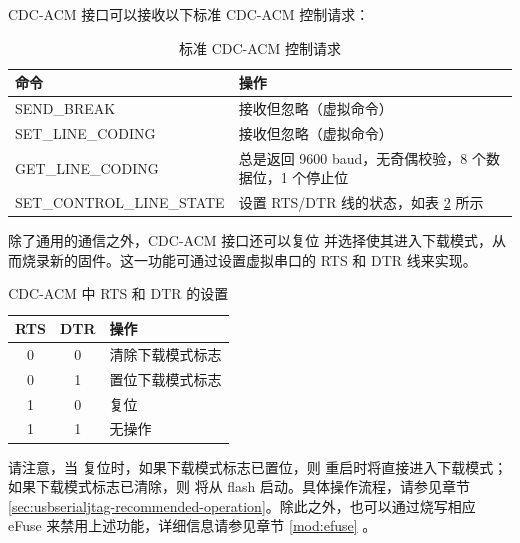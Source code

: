 \documentclass[main\_\_CN.tex]{subfiles}
\begin{document}
CDC-ACM 接口可以接收以下标准 CDC-ACM 控制请求：

\begin{table}[H]
    \centering
    \caption{标准 CDC-ACM 控制请求}
    \label{tab:usbserialjtag-standard-cdc-acm-requests}

    \begin{tabular}{ | l | l | }
    \hline
        \rowcolor{lightgray}
        \textbf{命令} & \textbf{操作} \\\hline

        SEND\_BREAK & 接收但忽略（虚拟命令）\\\hline
        SET\_LINE\_CODING & 接收但忽略（虚拟命令） \\\hline
        GET\_LINE\_CODING & 总是返回 9600 baud，无奇偶校验，8 个数据位，1 个停止位 \\\hline
        SET\_CONTROL\_LINE\_STATE & 设置 RTS/DTR 线的状态，如表 \ref{tab:usbserialjtag-cdc-acm-settings-with-rts-and-dtr} 所示 \\\hline
    \end{tabular}
\end{table}

除了通用的通信之外，CDC-ACM 接口还可以复位 \chipname{} 并选择使其进入下载模式，从而烧录新的固件。这一功能可通过设置虚拟串口的 RTS 和 DTR 线来实现。

\begin{table}[H]
    \centering
    \caption{CDC-ACM 中 RTS 和 DTR 的设置}
    \label{tab:usbserialjtag-cdc-acm-settings-with-rts-and-dtr}

    \begin{tabular}{ | c | c | p{5cm} | }
    \hline
        \rowcolor{lightgray}
        \textbf{RTS} & \textbf{DTR} & \textbf{操作}\\\hline

        0 & 0 & 清除下载模式标志 \\\hline
        0 & 1 & 置位下载模式标志  \\\hline
        1 & 0 & 复位 \chipname{}  \\\hline
        1 & 1 & 无操作 \\\hline
    \end{tabular}
\end{table}

请注意，当 \chipname{} 复位时，如果下载模式标志已置位，则 \chipname{} 重启时将直接进入下载模式；如果下载模式标志已清除，则 \chipname{} 将从 flash 启动。具体操作流程，请参见章节 \ref{sec:usbserialjtag-recommended-operation}。除此之外，也可以通过烧写相应 eFuse 来禁用上述功能，详细信息请参见章节 \ref{mod:efuse} \textit{}。
\end{document}
